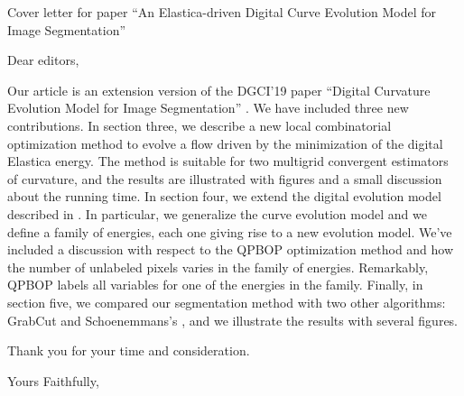 \documentclass{letter}
\begin{document}
\begin{letter}{Cover letter for paper ``An Elastica-driven Digital Curve Evolution Model for Image Segmentation''}
\opening{Dear editors,}

Our article is an extension version of the DGCI'19 paper ``Digital
Curvature Evolution Model for Image Segmentation''
\cite{antunes19}. We have included three new contributions. In section
three, we describe a new local combinatorial optimization method to
evolve a flow driven by the minimization of the digital Elastica
energy. The method is suitable for two multigrid convergent estimators
of curvature, and the results are illustrated with figures and a small
discussion about the running time. In section four, we extend the
digital evolution model described in \cite{antunes19}. In particular,
we generalize the curve evolution model and we define a family of
energies, each one giving rise to a new evolution model. We've
included a discussion with respect to the QPBOP optimization method
and how the number of unlabeled pixels varies in the family of
energies. Remarkably, QPBOP labels all variables for one of the
energies in the family. Finally, in section five, we compared our
segmentation method with two other algorithms: GrabCut
\cite{rother04grabcut} and Schoenemmans's \cite{schoenemann09linear},
and we illustrate the results with several figures.

Thank you for your time and consideration.

\closing{Yours Faithfully,}




\end{letter}


\end{document}
